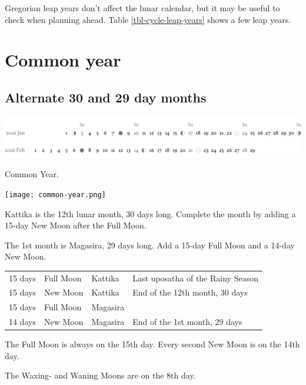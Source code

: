 \documentclass[11pt,oneside]{memoir-article}
\begin{document}
Gregorian leap years don't affect the lunar calendar, but it may be useful to
check when planning ahead. Table \ref{tbl-cycle-leap-years} shows a few leap
years.

\clearpage

\section{Common year}
\label{sec-1-2}
\label{common-year}
\subsection{Alternate 30 and 29 day months}
\label{sec-1-2-1}

\begin{fullwidth}
\includegraphics[width=\linewidth]{two-months.pdf}
\end{fullwidth}

\begin{marginfigure}[20mm]
\caption{\label{fig-common-year} Common Year.}
\texttt{[image: common-year.png]}
\end{marginfigure}

Kattika is the 12th lunar month, 30 days long. Complete the month by adding a
15-day New Moon after the Full Moon.

The 1st month is Magasira, 29 days long. Add a 15-day Full Moon and a 14-day New
Moon.

\begin{center}
\begin{tabular}{llll}
15 days & \mF{} Full Moon & Kattika & Last uposatha of the Rainy Season\\
15 days & \mN{} New Moon & Kattika & End of the 12th month, 30 days\\
15 days & \mF{} Full Moon & Magasira & \\
14 days & \mN{} New Moon & Magasira & End of the 1st month, 29 days\\
\end{tabular}
\end{center}

The Full Moon is always on the 15th day. Every second New Moon is on the 14th day.

The \GaWaxingmoon{} Waxing- and \GaWaningmoon{} Waning Moons are on the 8th day.
\end{document}
